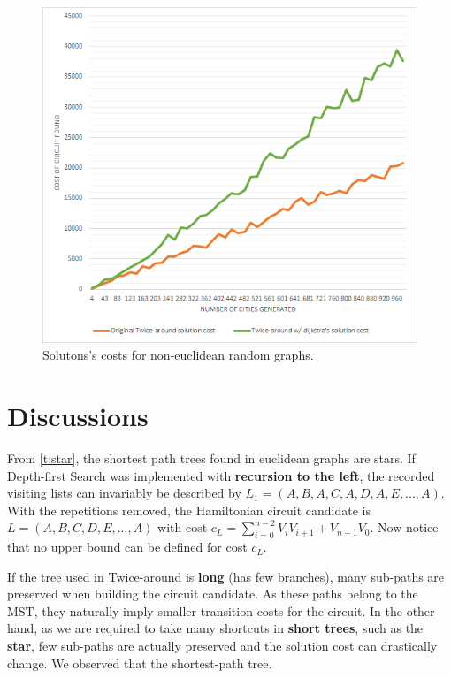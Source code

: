\documentclass[journal]{IEEEtran}
\begin{document}
\begin{figure}[H]
	\centering
	\includegraphics[width=.95\linewidth]{comparison-ta-random-graphs}
	\caption{Solutons's costs for non-euclidean random graphs.}
	\label{fig:ctrg}
\end{figure}

\section{Discussions}

From \ref{t:star}, the shortest path trees found in euclidean graphs are stars. If Depth-first Search was implemented with \textbf{recursion to the left}, the recorded visiting lists can invariably be described by $L_1=(A, B, A, C, A, D, A, E, ..., A)$. With the repetitions removed, the Hamiltonian circuit candidate is $L=(A,B,C, D, E, ..., A)$ with cost $c_L=\sum_{i=0}^{n-2} V_iV_{i+1} + V_{n-1}V_0$. Now notice that no upper bound can be defined for cost $c_L$.

If the tree used in Twice-around is \textbf{long} (has few branches), many sub-paths are preserved when building the circuit candidate. As these paths belong to the MST, they naturally imply smaller transition costs for the circuit. In the other hand, as we are required to take many shortcuts in \textbf{short trees}, such as the \textbf{star}, few sub-paths are actually preserved and the solution cost can drastically change. We observed that the shortest-path tree.
\end{document}
